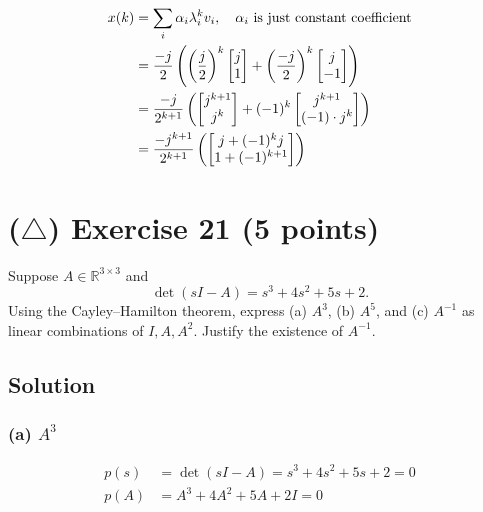 \documentclass[12pt,a4paper]{article}
\begin{document}
\begin{align*}
	x(k) &= \sum_i \alpha_i \lambda_i^k v_i ,  \quad \alpha_i \text{ is just constant coefficient} \\
	&= {-j\over2}  \left(
	 \left({j\over2}\right)^k \begin{bmatrix}
	 	j \\ 1
	 \end{bmatrix}  + \left({-j\over2}\right)^k \begin{bmatrix}
	 j \\ -1
	 \end{bmatrix} \right) \\
	 &= {-j \over 2^{k + 1}} \left( \begin{bmatrix}
	 	 j^{k + 1} \\ j^k
	 \end{bmatrix}  +  (-1)^k \begin{bmatrix}
	 	j^{k + 1} \\ (-1)\cdot j^k
	 \end{bmatrix} \right) \\
	 &= {-j^{k + 1} \over 2^{k + 1}} \left( \begin{bmatrix}
	 	j  + (-1)^k j \\ 1 + (-1)^{k + 1} 
	 \end{bmatrix} \right)
\end{align*}

\vspace{3cm}
\clearpage
\section*{($\triangle$) Exercise 21 \hfill {\normalsize (5 points)}}
Suppose $A\in\mathbb R^{3\times3}$ and
\[
\det(sI-A)=s^3+4s^2+5s+2.
\]
Using the Cayley--Hamilton theorem, express (a) $A^3$, (b) $A^5$, and (c) $A^{-1}$ as linear combinations of $I,A,A^2$. Justify the existence of $A^{-1}$.
\subsection*{Solution}

\subsubsection*{(a) $A^3$}

\begin{align*}
	p(s) &= \det(sI - A) = s^3 + 4s^2 + 5s + 2 = 0\\
	p(A) &= A^3 + 4A^2 + 5A + 2I = 0 
\end{align*}
\end{document}
